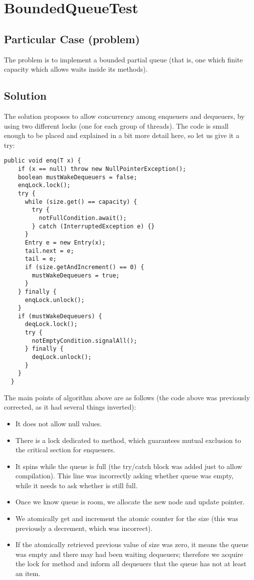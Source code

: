 \section{\textbf{BoundedQueueTest}}

\subsection{Particular Case (problem)}
The problem is to implement a bounded partial queue (that is, one
which finite capacity which allows waits inside its methods). 

\subsection{Solution}
The solution proposes to allow concurrency among enqueuers and
dequeuers, by using two different locks (one for each group of
threads). The code is small enough to be placed and explained in a bit
more detail here, so let us give it a try:

\begin{lstlisting}[style=numbers]
  public void enq(T x) {
    if (x == null) throw new NullPointerException();
    boolean mustWakeDequeuers = false;
    enqLock.lock();
    try {
      while (size.get() == capacity) {
        try {
          notFullCondition.await();
        } catch (InterruptedException e) {}
      }
      Entry e = new Entry(x);
      tail.next = e;
      tail = e;
      if (size.getAndIncrement() == 0) {
        mustWakeDequeuers = true;
      }
    } finally {
      enqLock.unlock();
    }
    if (mustWakeDequeuers) {
      deqLock.lock();
      try {
        notEmptyCondition.signalAll();
      } finally {
        deqLock.unlock();
      }
    }
  }
\end{lstlisting}
\hfill

The main points of algorithm above are as follows (the code above was
previously corrected, as it had several things inverted):

\begin{itemize}
\item It does not allow null values.
\item There is a lock dedicated to  method, which guarantees
  mutual exclusion to the critical section for enqueuers.
\item It spins while the queue is full (the try/catch block was added
  just to allow compilation). This line was incorrectly asking whether
  queue was empty, while it needs to ask whether is still full.
\item  Once we know queue is room, we allocate the new node and update
   pointer.
\item We atomically get and increment the atomic counter for the size
  (this was previously a decrement, which was incorrect).
\item If the atomically retrieved previous value of size was zero, it
  means the queue was empty and there may had been waiting dequeuers;
  therefore we acquire the lock for  method and inform all
  dequeuers that the queue has not at least an item.
\end{itemize}
\hfill

